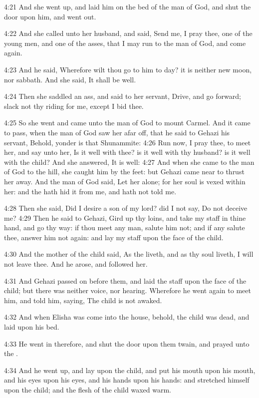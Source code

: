 4:21 And she went up, and laid him on the bed of the man of God, and
shut the door upon him, and went out.

4:22 And she called unto her husband, and said, Send me, I pray thee,
one of the young men, and one of the asses, that I may run to the man
of God, and come again.

4:23 And he said, Wherefore wilt thou go to him to day? it is neither
new moon, nor sabbath. And she said, It shall be well.

4:24 Then she saddled an ass, and said to her servant, Drive, and go
forward; slack not thy riding for me, except I bid thee.

4:25 So she went and came unto the man of God to mount Carmel. And it
came to pass, when the man of God saw her afar off, that he said to
Gehazi his servant, Behold, yonder is that Shunammite: 4:26 Run now, I
pray thee, to meet her, and say unto her, Is it well with thee? is it
well with thy husband? is it well with the child? And she answered, It
is well: 4:27 And when she came to the man of God to the hill, she
caught him by the feet: but Gehazi came near to thrust her away. And
the man of God said, Let her alone; for her soul is vexed within her:
and the \LORD hath hid it from me, and hath not told me.

4:28 Then she said, Did I desire a son of my lord? did I not say, Do
not deceive me?  4:29 Then he said to Gehazi, Gird up thy loins, and
take my staff in thine hand, and go thy way: if thou meet any man,
salute him not; and if any salute thee, answer him not again: and lay
my staff upon the face of the child.

4:30 And the mother of the child said, As the \LORD liveth, and as thy
soul liveth, I will not leave thee. And he arose, and followed her.

4:31 And Gehazi passed on before them, and laid the staff upon the
face of the child; but there was neither voice, nor hearing. Wherefore
he went again to meet him, and told him, saying, The child is not
awaked.

4:32 And when Elisha was come into the house, behold, the child was
dead, and laid upon his bed.

4:33 He went in therefore, and shut the door upon them twain, and
prayed unto the \LORD.

4:34 And he went up, and lay upon the child, and put his mouth upon
his mouth, and his eyes upon his eyes, and his hands upon his hands:
and stretched himself upon the child; and the flesh of the child waxed
warm.

